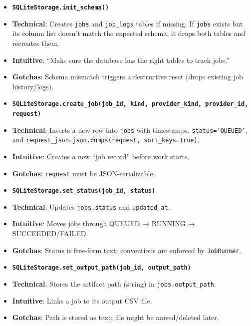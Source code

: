 \documentclass[11pt]{article}
\begin{document}
\begin{itemize}[leftmargin=*,nosep]
\item \textbf{\texttt{SQLiteStorage.init\_schema()}}
\item \textbf{Technical}: Creates \texttt{jobs} and \texttt{job\_logs} tables if missing. If \texttt{jobs} exists but its column list doesn’t match the expected schema, it drops both tables and recreates them.
\item \textbf{Intuitive}: “Make sure the database has the right tables to track jobs.”
\item \textbf{Gotchas}: Schema mismatch triggers a destructive reset (drops existing job history/logs).
\end{itemize}


\begin{itemize}[leftmargin=*,nosep]
\item \textbf{\texttt{SQLiteStorage.create\_job(job\_id, kind, provider\_kind, provider\_id, request)}}
\item \textbf{Technical}: Inserts a new row into \texttt{jobs} with timestamps, \texttt{status='QUEUED'}, and \texttt{request\_json=json.dumps(request, sort\_keys=True)}.
\item \textbf{Intuitive}: Creates a new “job record” before work starts.
\item \textbf{Gotchas}: \texttt{request} must be JSON-serializable.
\end{itemize}


\begin{itemize}[leftmargin=*,nosep]
\item \textbf{\texttt{SQLiteStorage.set\_status(job\_id, status)}}
\item \textbf{Technical}: Updates \texttt{jobs.status} and \texttt{updated\_at}.
\item \textbf{Intuitive}: Moves jobs through QUEUED → RUNNING → SUCCEEDED/FAILED.
\item \textbf{Gotchas}: Status is free-form text; conventions are enforced by \texttt{JobRunner}.
\end{itemize}


\begin{itemize}[leftmargin=*,nosep]
\item \textbf{\texttt{SQLiteStorage.set\_output\_path(job\_id, output\_path)}}
\item \textbf{Technical}: Stores the artifact path (string) in \texttt{jobs.output\_path}.
\item \textbf{Intuitive}: Links a job to its output CSV file.
\item \textbf{Gotchas}: Path is stored as text; file might be moved/deleted later.
\end{itemize}
\end{document}
